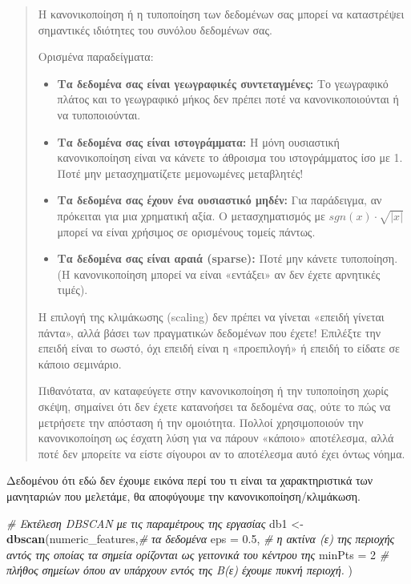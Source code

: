 \documentclass[
]{article}
\newenvironment{Shaded}{\begin{snugshade}}{\end{snugshade}}
\newcommand{\AttributeTok}[1]{\textcolor[rgb]{0.13,0.29,0.53}{#1}}
\newcommand{\CommentTok}[1]{\textcolor[rgb]{0.56,0.35,0.01}{\textit{#1}}}
\newcommand{\DecValTok}[1]{\textcolor[rgb]{0.00,0.00,0.81}{#1}}
\newcommand{\FloatTok}[1]{\textcolor[rgb]{0.00,0.00,0.81}{#1}}
\newcommand{\FunctionTok}[1]{\textcolor[rgb]{0.13,0.29,0.53}{\textbf{#1}}}
\newcommand{\NormalTok}[1]{#1}
\newcommand{\OtherTok}[1]{\textcolor[rgb]{0.56,0.35,0.01}{#1}}
\begin{document}
\begin{quote}
Η κανονικοποίηση ή η τυποποίηση των δεδομένων σας μπορεί να καταστρέψει
σημαντικές ιδιότητες του συνόλου δεδομένων σας.

Ορισμένα παραδείγματα:

\begin{itemize}
\item
  \textbf{Τα δεδομένα σας είναι γεωγραφικές συντεταγμένες:} Το
  γεωγραφικό πλάτος και το γεωγραφικό μήκος δεν πρέπει ποτέ να
  κανονικοποιούνται ή να τυποποιούνται.
\item
  \textbf{Τα δεδομένα σας είναι ιστογράμματα:} Η μόνη ουσιαστική
  κανονικοποίηση είναι να κάνετε το άθροισμα του ιστογράμματος ίσο με 1.
  Ποτέ μην μετασχηματίζετε μεμονωμένες μεταβλητές!
\item
  \textbf{Τα δεδομένα σας έχουν ένα ουσιαστικό μηδέν:} Για παράδειγμα,
  αν πρόκειται για μια χρηματική αξία. Ο μετασχηματισμός με
  \(sgn(x) \cdot \sqrt{|x|}\) μπορεί να είναι χρήσιμος σε ορισμένους
  τομείς πάντως.
\item
  \textbf{Τα δεδομένα σας είναι αραιά (sparse):} Ποτέ μην κάνετε
  τυποποίηση. (Η κανονικοποίηση μπορεί να είναι «εντάξει» αν δεν έχετε
  αρνητικές τιμές).
\end{itemize}

Η επιλογή της κλιμάκωσης (scaling) δεν πρέπει να γίνεται «επειδή γίνεται
πάντα», αλλά βάσει των πραγματικών δεδομένων που έχετε! Επιλέξτε την
επειδή είναι το σωστό, όχι επειδή είναι η «προεπιλογή» ή επειδή το
είδατε σε κάποιο σεμινάριο.

Πιθανότατα, αν καταφεύγετε στην κανονικοποίηση ή την τυποποίηση χωρίς
σκέψη, σημαίνει ότι δεν έχετε κατανοήσει τα δεδομένα σας, ούτε το πώς να
μετρήσετε την απόσταση ή την ομοιότητα. Πολλοί χρησιμοποιούν την
κανονικοποίηση ως έσχατη λύση για να πάρουν «κάποιο» αποτέλεσμα, αλλά
ποτέ δεν μπορείτε να είστε σίγουροι αν το αποτέλεσμα αυτό έχει όντως
νόημα.
\end{quote}

Δεδομένου ότι εδώ δεν έχουμε εικόνα περί του τι είναι τα χαρακτηριστικά
των μανηταριών που μελετάμε, θα αποφύγουμε την κανονικοποίηση/κλιμάκωση.

\begin{Shaded}
\begin{Highlighting}[]
\CommentTok{\# Εκτέλεση DBSCAN με τις παραμέτρους της εργασίας}
\NormalTok{db1 }\OtherTok{\textless{}{-}} \FunctionTok{dbscan}\NormalTok{(numeric\_features,}\CommentTok{\# τα δεδομένα}
              \AttributeTok{eps =} \FloatTok{0.5}\NormalTok{, }\CommentTok{\# η ακτίνα (ε) της περιοχής αντός της οποίας τα σημεία ορίζονται ως γειτονικά του κέντρου της}
              \AttributeTok{minPts =} \DecValTok{2} \CommentTok{\# πλήθος σημείων όπου αν υπάρχουν εντός της Β(ε) έχουμε πυκνή περιοχή.}
\NormalTok{              )}
\end{Highlighting}
\end{Shaded}
\end{document}

